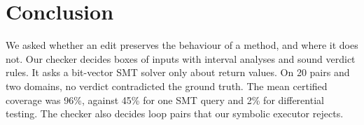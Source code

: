 \section{Conclusion}
\label{sec:conclusion}

We asked whether an edit preserves the behaviour of a method, and where it does not. Our
checker decides boxes of inputs with interval analyses and sound verdict rules. It asks a
bit-vector SMT solver only about return values. On 20 pairs and two domains, no verdict
contradicted the ground truth. The mean certified coverage was 96\%, against 45\% for one SMT
query and 2\% for differential testing. The checker also decides loop pairs that our symbolic
executor rejects.
